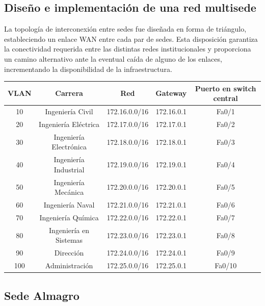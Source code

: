 \documentclass[a4paper,16pt]{article}
\begin{document}
	\begin{center}
	\section*{Diseño e implementación de una red multisede}
	\end{center}
	
	La topología de interconexión entre sedes fue diseñada en forma de triángulo, estableciendo un enlace WAN entre cada par de sedes. Esta disposición garantiza la conectividad requerida entre las distintas redes institucionales y proporciona un camino alternativo ante la eventual caída de alguno de los enlaces, incrementando la disponibilidad de la infraestructura.
	
	\vspace{1cm}
	
	\begin{tabular}{c|c|c|c|c}
		\textbf{VLAN} & \textbf{Carrera} & \textbf{Red} & \textbf{Gateway} & \textbf{Puerto en switch central}\\
		\hline
		10 & Ingeniería Civil & 172.16.0.0/16 & 172.16.0.1 & Fa0/1\\
		20 & Ingeniería Eléctrica & 172.17.0.0/16 & 172.17.0.1 & Fa0/2\\
		30 & Ingeniería Electrónica & 172.18.0.0/16 & 172.18.0.1 & Fa0/3\\
		40 & Ingeniería Industrial & 172.19.0.0/16 & 172.19.0.1 & Fa0/4\\
		50 & Ingeniería Mecánica & 172.20.0.0/16 & 172.20.0.1 & Fa0/5\\
		60 & Ingeniería Naval & 172.21.0.0/16 & 172.21.0.1 & Fa0/6\\
		70 & Ingeniería Química & 172.22.0.0/16 & 172.22.0.1 & Fa0/7\\
		80 & Ingeniería en Sistemas & 172.23.0.0/16 & 172.23.0.1 & Fa0/8\\
		90 & Dirección & 172.24.0.0/16 & 172.24.0.1 & Fa0/9\\
		100 & Administración & 172.25.0.0/16 & 172.25.0.1 & Fa0/10\\
	\end{tabular}

	\vspace{1cm}
	\subsection*{Sede Almagro}
\end{document}
